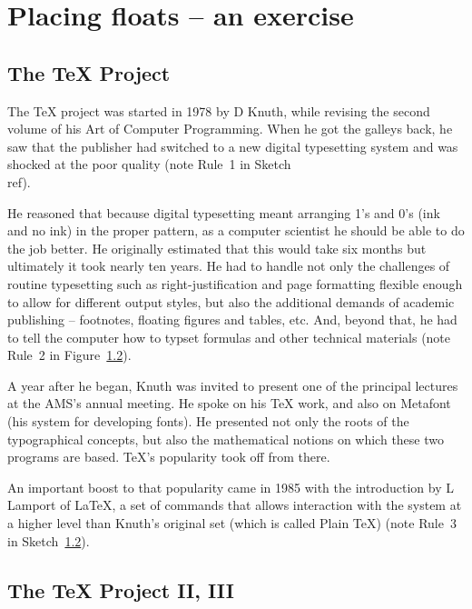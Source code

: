 \documentclass[12pt]{book}
\begin{document}
\chapter{Placing floats -- an exercise}
\section{The TeX Project}

The TeX project was started in 1978 by D Knuth, while revising the second volume of his Art of Computer Programming. When he got the
galleys back, he saw that the publisher had switched to a new digital typesetting system and was shocked at the poor quality (note Rule~1 in Sketch~\\ref{}).


He reasoned that because digital typesetting meant arranging 1's and 0's (ink and no ink) in the proper pattern, as a computer scientist
he should be able to do the job better. He originally estimated that this would take six months but ultimately it took nearly ten years.
He had to handle not only the challenges of routine typesetting such as right-justification and page formatting flexible enough to allow
for different output styles, but also the additional demands of academic publishing -- footnotes, floating figures and tables, etc. And,
beyond that, he had to tell the computer how to typset formulas and other technical materials (note Rule~2 in Figure~\ref{}).


A year after he began, Knuth was invited to present one of the principal lectures at the AMS's annual meeting. He spoke on his TeX work,
and also on Metafont (his system for developing fonts). He presented not only the roots of the typographical concepts, but also the
mathematical notions on which these two programs are based. TeX's popularity took off from there.

An important boost to that popularity came in 1985 with the introduction by L Lamport of LaTeX, a set of commands that allows interaction
with the system at a higher level than Knuth's original set (which is called Plain TeX) (note Rule~3 in Sketch~\ref{}).


\section{The TeX Project II, III}
\end{document}
